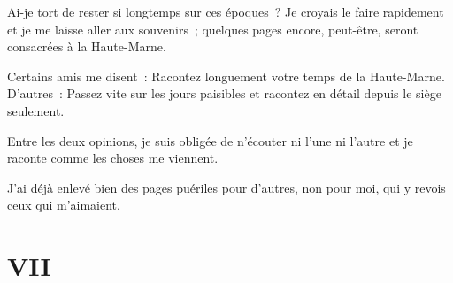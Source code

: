 \documentclass[french,twoside]{book} %
\newcommand\chapteropen{} %
\newcommand\chapterclose{} %
\begin{document}
Ai-je tort de rester si longtemps sur ces époques ? Je croyais le faire rapidement et je me laisse aller aux souvenirs ; quelques pages encore, peut-être, seront consacrées à la Haute-Marne.\par
 Certains amis me disent : Racontez longuement votre temps de la Haute-Marne. D’autres : Passez vite sur les jours paisibles et racontez en détail depuis le siège seulement.\par
Entre les deux opinions, je suis obligée de n’écouter ni l’une ni l’autre et je raconte comme les choses me viennent.\par
J’ai déjà enlevé bien des pages puériles pour d’autres, non pour moi, qui y revois ceux qui m’aimaient.
\chapterclose


\chapteropen
 \chapter[{VII}]{VII}
\label{p1.7}
\end{document}
